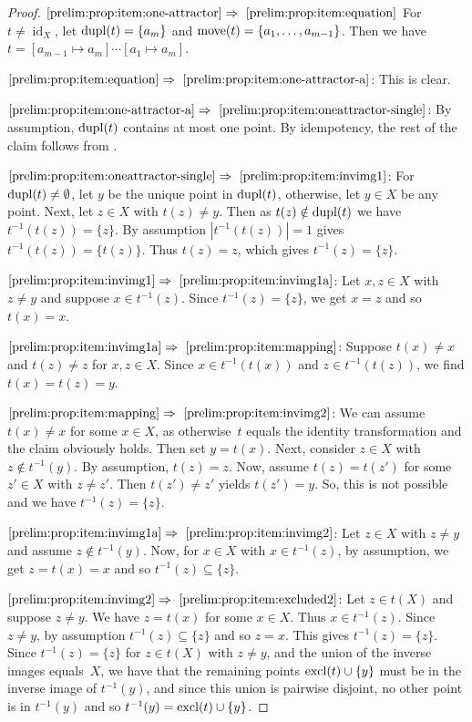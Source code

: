 \begin{proof}
	$\ref{prelim:prop:item:one-attractor} \Rightarrow~\ref{prelim:prop:item:equation}$
	For $t \ne \operatorname{id}_X$,
	let $\operatorname{dupl}(t) = \{a_m\}$ and $\operatorname{move}(t) = \{a_1, \ldots, a_{m-1}\}$.
	Then we have $t = [a_{m-1}\mapsto a_m] \cdots [a_1 \mapsto a_m]$.
		
	$\ref{prelim:prop:item:equation} \Rightarrow~\ref{prelim:prop:item:one-attractor-a}$:
	This is clear.
	
	$\ref{prelim:prop:item:one-attractor-a} \Rightarrow~\ref{prelim:prop:item:oneattractor-single}$: 
	By assumption, $\operatorname{dupl}(t)$ contains at most one point. By idempotency,
	the rest of the claim follows from .	
	
	$\ref{prelim:prop:item:oneattractor-single} \Rightarrow~\ref{prelim:prop:item:invimg1}$: 
	For $\operatorname{dupl}(t) \ne \emptyset$, let $y$
	be the unique point in $\operatorname{dupl}(t)$,
	otherwise, let $y \in X$ be any point.
	Next, let $z \in X$ with $t(z) \ne y$. 
	Then as $t(z) \notin \operatorname{dupl}(t)$ we have $t^{-1}(t(z)) = \{z\}$.
	By assumption $|t^{-1}(t(z))| = 1$
	gives $t^{-1}(t(z)) = \{t(z)\}$.
	Thus $t(z) = z$, which gives $t^{-1}(z) = \{z\}$. 

$\ref{prelim:prop:item:invimg1} \Rightarrow~\ref{prelim:prop:item:invimg1a}$: Let $x,z \in X$ with $z \ne y$ and suppose $x \in t^{-1}(z)$.
Since $t^{-1}(z) = \{z\}$, we get $x = z$ and so $t(x) = x$.

$\ref{prelim:prop:item:invimg1a} \Rightarrow~\ref{prelim:prop:item:mapping}$: Suppose $t(x) \ne x$ and $t(z) \ne z$
for $x,z \in X$.
Since $x \in t^{-1}(t(x))$ and $z \in t^{-1}(t(z))$,
we find $t(x) = t(z) = y$.

$\ref{prelim:prop:item:mapping} \Rightarrow~\ref{prelim:prop:item:invimg2}$: 
We can assume $t(x) \ne x$ for some $x \in X$, as otherwise~$t$
equals the identity transformation and the claim obviously holds.
Then set $y = t(x)$. Next, consider $z \in X$
with $z \notin t^{-1}(y)$.
By assumption, $t(z) = z$. Now, assume $t(z) = t(z')$ for some $z' \in X$
with $z \ne z'$.
Then $t(z') \ne z'$ yields $t(z') = y$. So, this is not possible
and we have $t^{-1}(z) = \{z\}$.

$\ref{prelim:prop:item:invimg1a} \Rightarrow~\ref{prelim:prop:item:invimg2}$: 	Let $z \in X$ with $z \ne y$
and assume $z \notin t^{-1}(y)$.
Now, for $x \in X$ with $x \in t^{-1}(z)$, by assumption, we get $z = t(x) = x$
and so $t^{-1}(z) \subseteq \{z\}$.

$\ref{prelim:prop:item:invimg2} \Rightarrow~\ref{prelim:prop:item:excluded2}$: 
 Let $z \in t(X)$ and suppose $z \ne y$.
 We have $z = t(x)$ for some $x \in X$.
 Thus $x \in t^{-1}(z)$. Since $z \ne y$,
 by assumption $t^{-1}(z) \subseteq \{z\}$
 and so $z = x$. This gives $t^{-1}(z) = \{z\}$.
 Since $t^{-1}(z) = \{z\}$ for $z \in t(X)$ with $z \ne y$,
 and the union of the inverse images equals~$X$,
 we have that the remaining points $\operatorname{excl}(t) \cup \{y\}$
 must be in the inverse image of $t^{-1}(y)$, 
 and since this union is pairwise disjoint, no other point is in $t^{-1}(y)$  
 and so $t^{-1}(y) = \operatorname{excl}(t) \cup \{y\}$.
 

\end{proof}
